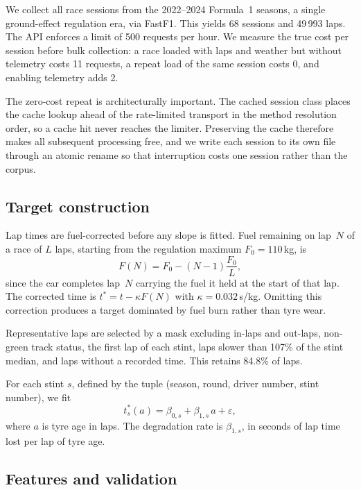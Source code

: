 \documentclass[conference]{IEEEtran}
\begin{document}
We collect all race sessions from the 2022--2024 Formula~1 seasons, a single
ground-effect regulation era, via FastF1. This yields 68 sessions and 49\,993
laps. The API enforces a limit of 500 requests per hour. We measure the true
cost per session before bulk collection: a race loaded with laps and weather
but without telemetry costs 11 requests, a repeat load of the same session
costs 0, and enabling telemetry adds 2.

The zero-cost repeat is architecturally important. The cached session class
places the cache lookup ahead of the rate-limited transport in the method
resolution order, so a cache hit never reaches the limiter. Preserving the
cache therefore makes all subsequent processing free, and we write each session
to its own file through an atomic rename so that interruption costs one session
rather than the corpus.

\subsection{Target construction}

Lap times are fuel-corrected before any slope is fitted. Fuel remaining on
lap~$N$ of a race of $L$ laps, starting from the regulation maximum
$F_0 = 110$\,kg, is
\begin{equation}
F(N) = F_0 - (N-1)\frac{F_0}{L},
\end{equation}
since the car completes lap~$N$ carrying the fuel it held at the start of that
lap. The corrected time is $t^{*} = t - \kappa F(N)$ with
$\kappa = 0.032$\,s/kg. Omitting this correction produces a target dominated by
fuel burn rather than tyre wear.

Representative laps are selected by a mask excluding in-laps and out-laps,
non-green track status, the first lap of each stint, laps slower than 107\% of
the stint median, and laps without a recorded time. This retains 84.8\% of laps.

For each stint $s$, defined by the tuple (season, round, driver number, stint
number), we fit
\begin{equation}
t^{*}_{s}(a) = \beta_{0,s} + \beta_{1,s}\, a + \varepsilon,
\label{eq:slope}
\end{equation}
where $a$ is tyre age in laps. The degradation rate is $\beta_{1,s}$, in
seconds of lap time lost per lap of tyre age.

\subsection{Features and validation}
\end{document}

